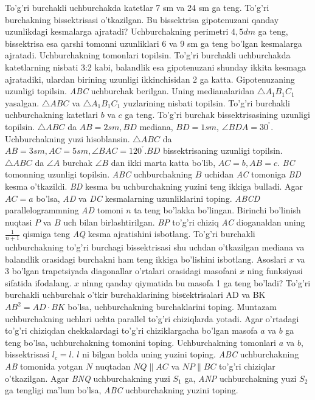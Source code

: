 To'g'ri burchakli uchburchakda katetlar 7 sm va 24 sm ga teng. To'g'ri burchakning bissektrisasi o'tkazilgan. Bu bissektrisa gipotenuzani qanday uzunlikdagi kesmalarga ajratadi?
Uchburchakning perimetri \(4,5dm\) ga teng, bissektrisa esa qarshi tomonni uzunliklari 6 va 9 sm ga teng bo'lgan kesmalarga ajratadi. Uchburchakning tomonlari topilsin.
To'g'ri burchakli uchburchakda katetlarning nisbati 3:2 kabi, balandlik esa gipotenuzani shunday ikkita kesmaga ajratadiki, ulardan birining uzunligi ikkinchisidan 2 ga katta. Gipotenuzaning uzunligi topilsin.
\emph{ABC} uchburchak berilgan. Uning medianalaridan \(\bigtriangleup A_{1}B_{1}C_{1}\) yasalgan. \(\bigtriangleup ABC\) va \(\bigtriangleup A_{1}B_{1}C_{1}\) yuzlarining nisbati topilsin.
To'g'ri burchakli uchburchakning katetlari \(b\) va \(c\) ga teng. To'g'ri burchak bissektrisasining uzunligi topilsin.
\(\bigtriangleup ABC\) da \(AB = 2sm,BD\) mediana, \(BD = 1sm\), \(\angle BDA = 30^{{^\circ}}\). Uchburchakning yuzi hisoblansin.
\(\bigtriangleup ABC\) da \(AB = 3sm,AC = 5sm,\angle BAC = 120^{{^\circ}}.BD\) bissektrisaning uzunligi topilsin.
\(\bigtriangleup ABC\) da \(\angle A\) burchak \(\angle B\) dan ikki marta katta bo'lib, \(AC = b,AB = c\). \emph{BC} tomonning uzunligi topilsin.
\emph{ABC} uchburchakning \(B\) uchidan \emph{AC} tomoniga \emph{BD} kesma o'tkazildi. \emph{BD} kesma bu uchburchakning yuzini teng ikkiga bulladi. Agar \(AC = a\) bo'lsa, \emph{AD} va \emph{DC} kesmalarning uzunliklarini toping.
\emph{ABCD} parallelogrammning \emph{AD} tomoni \(n\) ta teng bo'lakka bo'lingan. Birinchi bo'linish nuqtasi \(P\) va \(B\) uch bilan birlashtirilgan. \emph{BP} to'g'ri chiziq \emph{AC} dioganaldan uning \(\frac{1}{n + 1}\) qismiga teng \emph{AQ} kesma ajratishini isbotlang.
To'g'ri burchakli uchburchakning to'g'ri burchagi bissektrisasi shu uchdan o'tkazilgan mediana va balandlik orasidagi burchakni ham teng ikkiga bo'lishini isbotlang.
Asoslari \(x\) va 3 bo'lgan trapetsiyada diagonallar o'rtalari orasidagi masofani \(x\) ning funksiyasi sifatida ifodalang. \(x\) nіnng qanday qiymatida bu masofa 1 ga teng bo'ladi?
To'g'ri burchakli uchburchak o'tkir burchaklarining bisєektrisalari AD va BK \(AB^{2} = AD \cdot BK\) bo'lsa, uchburchakning burchaklarini toping.
Muntazam uchburchakning uchlari uchta parallel to'g'ri chiziqlarda yotadi. Agar o'rtadagi to'g'ri chiziqdan chekkalardagi to'g'ri chiziklargacha bo'lgan masofa \(a\) va \(b\) ga teng bo'lsa, uchburchakning tomonini toping.
Uchburchakning tomonlari \(a\) va \(b\), bissektrisasi \(l_{c} = l\). \(l\) ni bilgan holda uning yuzini toping.
\emph{ABC} uchburchakning \emph{AB} tomonida yotgan \(N\) nuqtadan \(NQ\| AC\) va \(NP\| BC\) to'g'ri chiziqlar o'tkazilgan. Agar \emph{BNQ} uchburchakning yuzi \(S_{1}\) ga, \emph{ANP} uchburchakning yuzi \(S_{2}\) ga tengligi ma'lum bo'lsa, \emph{ABC} uchburchakning yuzini toping.
